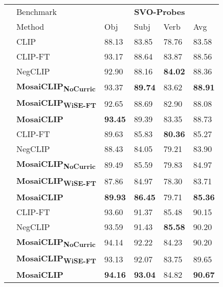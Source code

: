 \documentclass[11pt]{article}
\newcommand{\methodcompbold}{\textbf{MosaiCLIP}}
\newcommand{\methodcompNoCurricbold}{\textbf{MosaiCLIP\textsubscript{NoCurric}}}
\newcommand{\methodcompwiseftbold}{\textbf{MosaiCLIP\textsubscript{WiSE-FT}}}
\newcommand{\clip}{CLIP}
\newcommand{\negclip}{NegCLIP}
\begin{document}
\begin{table}[h!]
\begin{table}[h!]
\footnotesize
  \centering
  \begin{tabular}{p{0.15cm}p{2.2cm}p{0.7cm}p{0.7cm}p{0.7cm}p{0.7cm}}
      \toprule
      & \multicolumn{1}{l}{Benchmark } & \multicolumn{4}{c}{\textbf{SVO-Probes}} \\
      \cmidrule(lr){3-6}
      & Method & Obj & Subj & Verb & Avg \\ 
      \cmidrule{2-6}
       & \clip{} & 88.13 & 83.85 & 78.76 & 83.58 \\ 
       \midrule
       & \clip{}-FT & 93.17 & 88.64 & 83.87 & 88.56 \\ 
       & \negclip{} & 92.90 & 88.16 & \textbf{84.02} & 88.36 \\ 
       \rowcolor{cyan!12}
       \cellcolor{white}
       & \methodcompNoCurricbold{} & 93.37 & \textbf{89.74} & 83.62 & \textbf{88.91} \\ 
       \rowcolor{cyan!12}
       \cellcolor{white}
       & \methodcompwiseftbold{} & 92.65 & 88.69 & 82.90 & 88.08 \\ 
       \rowcolor{cyan!12}
       \cellcolor{white} \multirow{-5}{*}{\rotatebox[origin=c]{90}{CC-100K}}
       & \methodcompbold{} & \textbf{93.45} & 89.39 & 83.35 & 88.73 \\ 
      \midrule
       & \clip{}-FT & 89.63 & 85.83 & \textbf{80.36} & 85.27 \\ 
       & \negclip{} & 88.43 & 84.05 & 79.21 & 83.90 \\ 
       \rowcolor{cyan!12}
       \cellcolor{white}
       & \methodcompNoCurricbold{} & 89.49 & 85.59 & 79.83 & 84.97 \\ 
       \rowcolor{cyan!12}
       \cellcolor{white}
       & \methodcompwiseftbold{} & 87.86 & 84.97 & 78.30 & 83.71 \\
       \rowcolor{cyan!12}
       \cellcolor{white} \multirow{-5}{*}{\rotatebox[origin=c]{90}{YFCC-100K}}
       & \methodcompbold{} & \textbf{89.93} & \textbf{86.45} & 79.71 & \textbf{85.36} \\
      \midrule
       & \clip{}-FT & 93.60 & 91.37 & 85.48 & 90.15 \\ 
       & \negclip{} & 93.59 & 91.43 & \textbf{85.58} & 90.20 \\ 
       \rowcolor{cyan!12}
       \cellcolor{white}
       & \methodcompNoCurricbold{} & 94.14 & 92.22 & 84.23 & 90.20 \\ 
       \rowcolor{cyan!12}
       \cellcolor{white}
       & \methodcompwiseftbold{} & 93.13 & 92.07 & 83.75 & 89.65 \\
       \rowcolor{cyan!12}
       \cellcolor{white} \multirow{-5}{*}{\rotatebox[origin=c]{90}{COCO}}
       & \methodcompbold{} & \textbf{94.16} & \textbf{93.04} & 84.82 & \textbf{90.67} \\
      \bottomrule
  \end{tabular}


\end{table}
\end{table}
\end{document}
